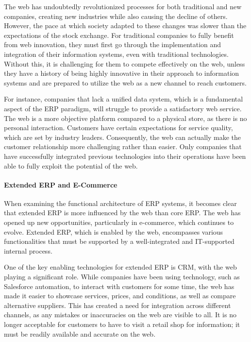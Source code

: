 The web has undoubtedly revolutionized processes for both traditional
and new companies, creating new industries while also causing the
decline of others. However, the pace at which society adapted to these
changes was slower than the expectations of the stock exchange. For
traditional companies to fully benefit from web innovation, they must
first go through the implementation and integration of their information
systems, even with traditional technologies. Without this, it is
challenging for them to compete effectively on the web, unless they have
a history of being highly innovative in their approach to information
systems and are prepared to utilize the web as a new channel to reach
customers.

For instance, companies that lack a unified data system, which is a
fundamental aspect of the ERP paradigm, will struggle to provide a
satisfactory web service. The web is a more objective platform compared
to a physical store, as there is no personal interaction. Customers have
certain expectations for service quality, which are set by industry
leaders. Consequently, the web can actually make the customer
relationship more challenging rather than easier. Only companies that
have successfully integrated previous technologies into their operations
have been able to fully exploit the potential of the web.

\paragraph{Extended ERP and E-Commerce}\label{extended-erp-and-e-commerce}

When examining the functional architecture of ERP systems, it becomes
clear that extended ERP is more influenced by the web than core ERP. The
web has opened up new opportunities, particularly in e-commerce, which
continues to evolve. Extended ERP, which is enabled by the web,
encompasses various functionalities that must be supported by a
well-integrated and IT-supported internal process.

One of the key enabling technologies for extended ERP is CRM, with the
web playing a significant role. While companies have been using
technology, such as Salesforce automation, to interact with customers
for some time, the web has made it easier to showcase services, prices,
and conditions, as well as compare alternative suppliers. This has
created a need for integration across different channels, as any
mistakes or inaccuracies on the web are visible to all. It is no longer
acceptable for customers to have to visit a retail shop for information;
it must be readily available and accurate on the web.

